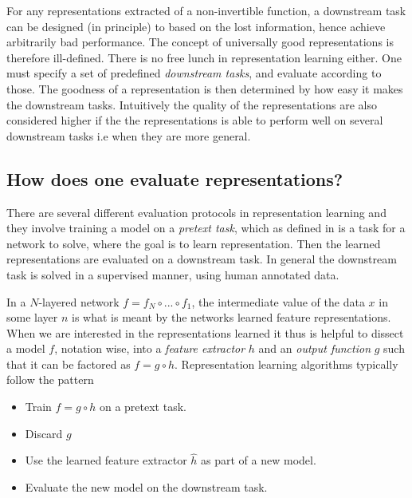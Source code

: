 \documentclass[../../thesis.tex]{subfiles}
\begin{document}
For any representations extracted of a non-invertible function, a downstream task can be designed (in principle) to based on the lost information, hence achieve arbitrarily bad performance. The concept of universally good representations is therefore ill-defined. There is no free lunch in representation learning either. One must specify a set of predefined \textit{downstream tasks}, and evaluate according to those. The goodness of a representation is then determined by how easy it makes the downstream tasks. Intuitively the quality of the representations are also considered higher if the the representations is able to perform well on several downstream tasks i.e when they are more general. 

\subsection{How does one evaluate representations?}
There are several different evaluation protocols in representation learning and they involve training a model on a \textit{pretext task}, which as defined in \cite{jing2019selfsupervised} is a task for a network to solve, where the goal is to learn representation. Then the learned representations are evaluated on a downstream task. In general the downstream task is solved in a supervised manner, using human annotated data.\newline

In a $N$-layered network $f = f_N\circ ...\circ f_1$, the intermediate value of the data $x$ in some layer $n$ is what is meant by the networks learned feature representations. When we are interested in the representations learned it thus is helpful to dissect a model $f$, notation wise, into a \textit{feature extractor} $h$ and an \textit{output function} $g$ such that it can be factored as $f = g \circ h$. Representation learning algorithms typically follow the pattern
\begin{itemize}
    \item Train $f= g \circ h$ on a pretext task.
    \item Discard $g$
    \item Use the learned feature extractor $\widehat{h}$ as part of a new model.
    \item Evaluate the new model on the downstream task. 
\end{itemize}




\end{document}
